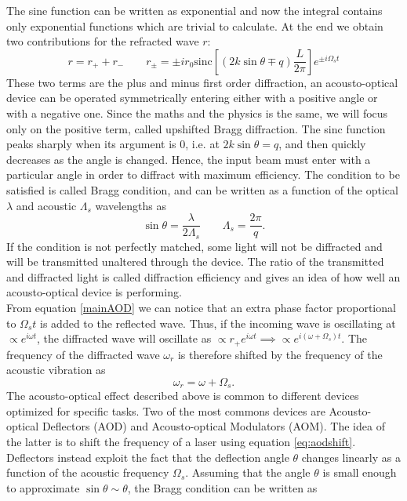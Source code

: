 The sine function can be written as exponential and now the integral contains only exponential functions which are trivial to calculate. At the end we obtain two contributions for the refracted wave $r$:
\begin{equation}
\label{mainAOD}
r = r_+ + r_- \qquad r_\pm = \pm i r_0 \text{sinc} \left[(2k\sin\theta \mp q)\frac{L}{2\pi} \right]e^{\pm i\Omega_s t}
\end{equation}
These two terms are the plus and minus first order diffraction, an acousto-optical device can be operated symmetrically entering either with a positive angle or with a negative one. Since the maths and the physics is the same, we will focus only on the positive term, called upshifted Bragg diffraction. The sinc function peaks sharply when its argument is 0, i.e. at $2k\sin\theta = q$, and then quickly decreases as the angle is changed. Hence, the input beam must enter with a particular angle in order to diffract with maximum efficiency. The condition to be satisfied is called Bragg condition, and can be written as a function of the optical $\lambda$ and acoustic $\Lambda_s$ wavelengths as
\begin{equation}
\label{braggcondition}
\sin \theta  = \frac{\lambda}{2 \Lambda_s} \qquad \Lambda_s = \frac{2\pi}{q}.
\end{equation}
If the condition is not perfectly matched, some light will not be diffracted and will be transmitted unaltered through the device.
The ratio of the transmitted and diffracted light is called diffraction efficiency and gives an idea of how well an acousto-optical device is performing.\\
From equation \eqref{mainAOD} we can notice that an extra phase factor proportional to $\Omega_s t$ is added to the reflected wave. Thus, if the incoming wave is oscillating at $\propto e^{i\omega t}$, the diffracted wave will oscillate as $\propto r_{+}e^{i\omega t} \implies \propto e^{i(\omega + \Omega_s )t}$. The frequency of the diffracted wave $\omega_r$ is therefore shifted by the frequency of the acoustic vibration as
\begin{equation}
\label{eq:aodshift}
\omega_r  =  \omega + \Omega_s.
\end{equation}
The acousto-optical effect described above is common to different devices optimized for specific tasks. Two of the most commons devices are Acousto-optical Deflectors (AOD) and Acousto-optical Modulators (AOM). The idea of the latter is to shift the frequency of a laser using equation \eqref{eq:aodshift}. Deflectors instead exploit the fact that the deflection angle $\theta$ changes linearly as a function of the acoustic frequency $\Omega_s$. Assuming that the angle $\theta$ is small enough to approximate $\sin\theta \sim \theta$, the Bragg condition can be written as
